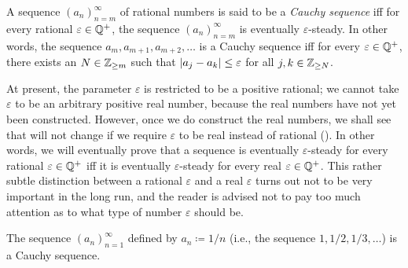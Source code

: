 \setcounter{thm}{7}
\begin{defn}\label{i:5.1.8}
  A sequence \((a_n)_{n = m}^{\infty}\) of rational numbers is said to be a \emph{Cauchy sequence} iff for every rational \(\varepsilon \in \mathbb{Q}^+\), the sequence \((a_n)_{n = m}^{\infty}\) is eventually \(\varepsilon\)-steady.
  In other words, the sequence \(a_m, a_{m + 1}, a_{m + 2}, \dots\) is a Cauchy sequence iff for every \(\varepsilon \in \mathbb{Q}^+\), there exists an \(N \in \mathbb{Z}_{\geq m}\) such that \(\left\lvert a_j - a_k\right\rvert \leq \varepsilon\) for all \(j, k \in \mathbb{Z}_{\geq N}\).
\end{defn}

\begin{rmk}\label{i:5.1.9}
  At present, the parameter \(\varepsilon\) is restricted to be a positive rational;
  we cannot take \(\varepsilon\) to be an arbitrary positive real number, because the real numbers have not yet been constructed.
  However, once we do construct the real numbers, we shall see that  will not change if we require \(\varepsilon\) to be real instead of rational ().
  In other words, we will eventually prove that a sequence is eventually \(\varepsilon\)-steady for every rational \(\varepsilon \in \mathbb{Q}^+\) iff it is eventually \(\varepsilon\)-steady for every real \(\varepsilon \in \mathbb{Q}^+\).
  This rather subtle distinction between a rational \(\varepsilon\) and a real \(\varepsilon\) turns out not to be very important in the long run, and the reader is advised not to pay too much attention as to what type of number \(\varepsilon\) should be.
\end{rmk}

\setcounter{thm}{10}
\begin{prop}\label{i:5.1.11}
  The sequence \((a_n)_{n = 1}^\infty\) defined by \(a_n \coloneqq 1 / n\) (i.e., the sequence \(1, 1 / 2, 1 / 3, \dots\)) is a Cauchy sequence.
\end{prop}

